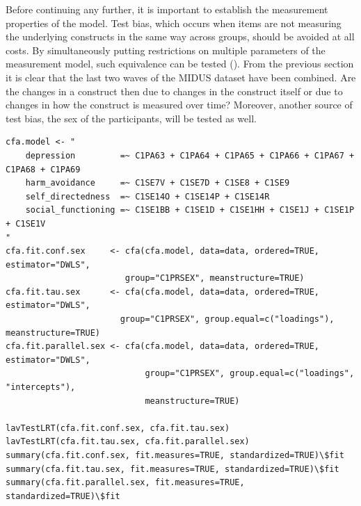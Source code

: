 \documentclass[11pt]{article}
\begin{document}
Before continuing any further, it is important to establish the measurement
properties of the model. Test bias, which occurs when items are not measuring
the underlying constructs in the same way across groups, should be avoided at
all costs. By simultaneously putting restrictions on multiple parameters of the
measurement model, such equivalence can be tested (\cite{brown2015}). From the
previous section it is clear that the last two waves of the MIDUS dataset have
been combined. Are the changes in a construct then due to changes in the
construct itself or due to changes in how the construct is measured over time?
Moreover, another source of test bias, the sex of the participants, will be
tested as well.

\begin{minipage}{\linewidth}
\begin{lstlisting}
cfa.model <- "
    depression         =~ C1PA63 + C1PA64 + C1PA65 + C1PA66 + C1PA67 + C1PA68 + C1PA69
    harm_avoidance     =~ C1SE7V + C1SE7D + C1SE8 + C1SE9
    self_directedness  =~ C1SE14O + C1SE14P + C1SE14R
    social_functioning =~ C1SE1BB + C1SE1D + C1SE1HH + C1SE1J + C1SE1P + C1SE1V
"
cfa.fit.conf.sex     <- cfa(cfa.model, data=data, ordered=TRUE, estimator="DWLS",
                        group="C1PRSEX", meanstructure=TRUE)
cfa.fit.tau.sex      <- cfa(cfa.model, data=data, ordered=TRUE, estimator="DWLS",
                       group="C1PRSEX", group.equal=c("loadings"), meanstructure=TRUE)
cfa.fit.parallel.sex <- cfa(cfa.model, data=data, ordered=TRUE, estimator="DWLS",
                            group="C1PRSEX", group.equal=c("loadings", "intercepts"),
                            meanstructure=TRUE)

lavTestLRT(cfa.fit.conf.sex, cfa.fit.tau.sex)
lavTestLRT(cfa.fit.tau.sex, cfa.fit.parallel.sex)
summary(cfa.fit.conf.sex, fit.measures=TRUE, standardized=TRUE)\$fit
summary(cfa.fit.tau.sex, fit.measures=TRUE, standardized=TRUE)\$fit
summary(cfa.fit.parallel.sex, fit.measures=TRUE, standardized=TRUE)\$fit
\end{lstlisting}
\end{minipage}
\end{document}
